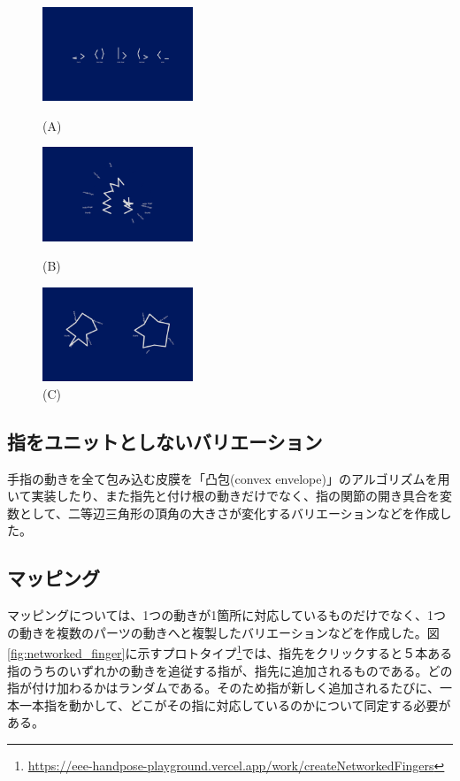 \begin{figure}[htbp]
  \begin{minipage}[b]{0.33\linewidth}
    \centering
    \includegraphics[keepaspectratio, width=4.5cm]{img/kunoji-pararell.png}
    \caption{(A)}
    \label{fig:kunoji_a}
  \end{minipage}
  \begin{minipage}[b]{0.33\linewidth}
    \centering
    \includegraphics[keepaspectratio, width=4.5cm]{img/kunoji-direct.png}
    \caption{(B)}
    \label{fig:kunoji_b}
  \end{minipage}
  \begin{minipage}[b]{0.33\linewidth}
    \centering
    \includegraphics[keepaspectratio, width=4.5cm]{img/kunoji-circle.png}
    \caption{(C)}
    \label{fig:kunoji_c}
  \end{minipage}
\end{figure}

\subsection*{指をユニットとしないバリエーション}
手指の動きを全て包み込む皮膜を「凸包(convex envelope)」のアルゴリズムを用いて実装したり、また指先と付け根の動きだけでなく、指の関節の開き具合を変数として、二等辺三角形の頂角の大きさが変化するバリエーションなどを作成した。

\subsection{マッピング}
マッピングについては、1つの動きが1箇所に対応しているものだけでなく、1つの動きを複数のパーツの動きへと複製したバリエーションなどを作成した。図\ref{fig:networked_finger}に示すプロトタイプ\footnote{\url{https://eee-handpose-playground.vercel.app/work/createNetworkedFingers}}では、指先をクリックすると５本ある指のうちのいずれかの動きを追従する指が、指先に追加されるものである。どの指が付け加わるかはランダムである。そのため指が新しく追加されるたびに、一本一本指を動かして、どこがその指に対応しているのかについて同定する必要がある。

